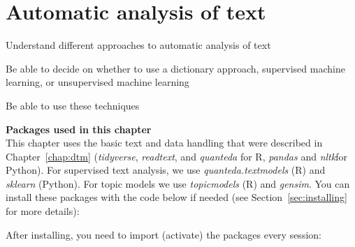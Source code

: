 \chapter{ Automatic analysis of text}
\label{chap:text}



\begin{abstract}{Abstract}
  In this chapter, we discuss different approaches to the automatic analysis of text; or automated content analysis. We combine techniques from earlier chapters, such as transforming texts into a matrix of term frequencies and machine learning. In particular, we describe three different approaches (dictionary-based analyses, supervised machine learning, unsupervised machine learning). The chapter provides guidance on how to conduct such analyses, and also on how to decide which of the approaches is most suitable for which types of question.
\end{abstract}


\begin{objectives}
\item Understand different approaches to automatic analysis of text
\item Be able to decide on whether to use a dictionary approach, supervised machine learning, or unsupervised machine learning
\item Be able to use these techniques
\end{objectives}


\newpage
\begin{feature}
  \textbf{Packages used in this chapter}\\
  This chapter uses the basic text and data handling that were described in Chapter~\ref{chap:dtm} (\emph{tidyverse}, \emph{readtext}, and \emph{quanteda} for R, \emph{pandas} and \emph{nltk}for Python).
  For supervised text analysis, we use \emph{quanteda.textmodels} (R) and \emph{sklearn} (Python).
  For topic models we use \emph{topicmodels} (R) and \emph{gensim}.
  You can install these packages with the code below if needed  (see Section~\ref{sec:installing} for more details):


\noindent After installing, you need to import (activate) the packages every session:

\end{feature}


